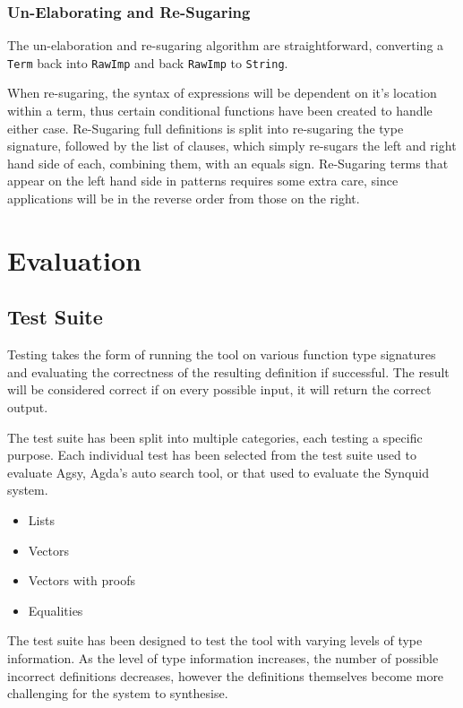 \documentclass[a4paper]{article}
\begin{document}
\subsubsection{Un-Elaborating and Re-Sugaring}

The un-elaboration and re-sugaring algorithm are straightforward,
converting a \texttt{Term} back into \texttt{RawImp} and back \texttt{RawImp} to \texttt{String}.

When re-sugaring, the syntax of expressions will be dependent on it's location within a term,
thus certain conditional functions have been created to handle either case.
Re-Sugaring full definitions is split into re-sugaring the type
signature, followed by the list of clauses, which simply re-sugars the
left and right hand side of each, combining them, with an equals sign.
Re-Sugaring terms that appear on the left hand side in patterns
requires some extra care, since applications will be in the reverse
order from those on the right. 



\section{Evaluation}
\label{sec:org2fc5750}

\subsection{Test Suite}

Testing takes the form of running the tool on various
function type signatures and evaluating the correctness
of the resulting definition if successful. The result
will be considered correct if on every possible input, it
will return the correct output. 

The test suite has been split into multiple categories, 
each testing a specific purpose. Each individual test 
has been selected from the test suite used to evaluate 
Agsy, Agda's auto search tool, or that used to evaluate the Synquid system.


\begin{itemize}
\item Lists
\item Vectors
\item Vectors with proofs
\item Equalities
\end{itemize}

The test suite has been designed to test the tool with varying
levels of type information. As the level of type information
increases, the number of possible incorrect definitions decreases,
however the definitions themselves become more challenging for the
system to synthesise.
\end{document}
